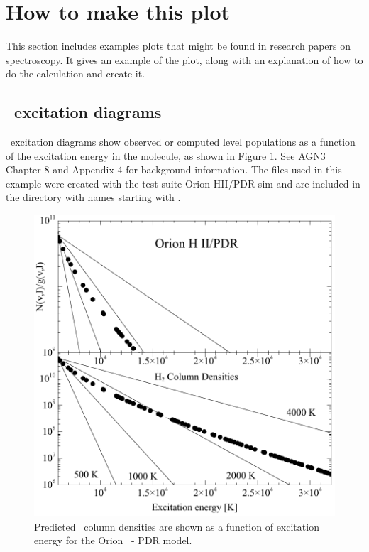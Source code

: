 \documentclass[12pt,twoside]{article}
\begin{document}
{\section{How to make this plot}

This section includes examples plots that might be found in research papers on spectroscopy.
It gives an example of the plot, along with an explanation of how to do the calculation
and create it.

\subsection{\htwo\ excitation diagrams}

\htwo\ excitation diagrams show observed or computed level populations 
as a function of the excitation energy in the molecule,
as shown in Figure \ref{fig:H2BFM}.
See AGN3 Chapter 8 and Appendix 4 for background information.
The files used in this example were created with the test suite \citet{Baldwin1991} Orion HII/PDR sim and
are included in the  directory with names starting with
.

\begin{figure}
\begin{center}
\includegraphics[scale=0.5]{H2_BFM}
\end{center}
\caption{Predicted \htwo\ column densities are shown as a function of excitation energy for
the \citet{Baldwin1991} Orion  \hii\ - PDR model.}
\label{fig:H2BFM}
\end{figure}

}
\end{document}
